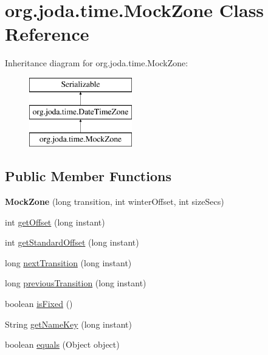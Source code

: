 \hypertarget{classorg_1_1joda_1_1time_1_1_mock_zone}{\section{org.\-joda.\-time.\-Mock\-Zone Class Reference}
\label{classorg_1_1joda_1_1time_1_1_mock_zone}
}
Inheritance diagram for org.\-joda.\-time.\-Mock\-Zone\-:\begin{figure}[H]
\begin{center}
\leavevmode
\includegraphics[height=3.000000cm]{classorg_1_1joda_1_1time_1_1_mock_zone}
\end{center}
\end{figure}
\subsection*{Public Member Functions}
\begin{DoxyCompactItemize}
\item 
\hypertarget{classorg_1_1joda_1_1time_1_1_mock_zone_acc5ee3e0735f8dbcffebad63f8b47764}{{\bfseries Mock\-Zone} (long transition, int winter\-Offset, int size\-Secs)}\label{classorg_1_1joda_1_1time_1_1_mock_zone_acc5ee3e0735f8dbcffebad63f8b47764}

\item 
int \hyperlink{classorg_1_1joda_1_1time_1_1_mock_zone_a35e62050755a5d5af7bcf179e8c70952}{get\-Offset} (long instant)
\item 
int \hyperlink{classorg_1_1joda_1_1time_1_1_mock_zone_a8619ba6ef1425f4b29b38a30eb415899}{get\-Standard\-Offset} (long instant)
\item 
long \hyperlink{classorg_1_1joda_1_1time_1_1_mock_zone_a65537274d107fe8af88d0a3214a13841}{next\-Transition} (long instant)
\item 
long \hyperlink{classorg_1_1joda_1_1time_1_1_mock_zone_af27088b69a3b1a9ea12a84dc557b3ce7}{previous\-Transition} (long instant)
\item 
boolean \hyperlink{classorg_1_1joda_1_1time_1_1_mock_zone_abcb6e1edabbd5a01b23333e56940bb58}{is\-Fixed} ()
\item 
String \hyperlink{classorg_1_1joda_1_1time_1_1_mock_zone_ac663c30019c0e5ab53023253b468e191}{get\-Name\-Key} (long instant)
\item 
boolean \hyperlink{classorg_1_1joda_1_1time_1_1_mock_zone_ac54c3388659fb46039c0f4fed91f699b}{equals} (Object object)
\end{DoxyCompactItemize}
